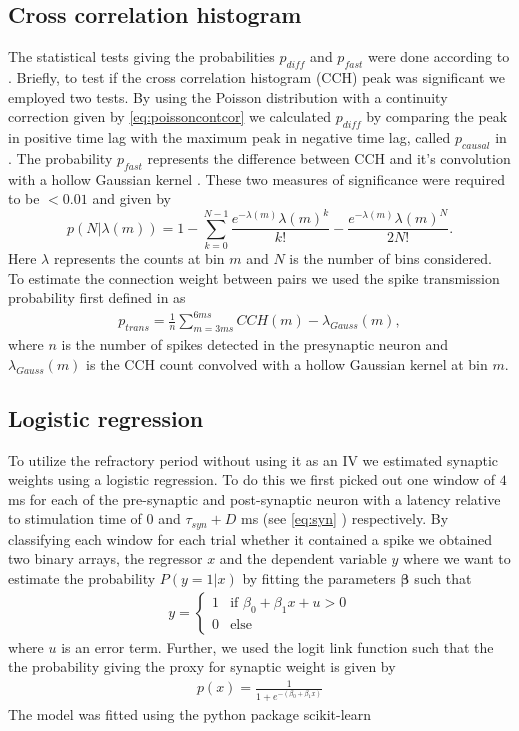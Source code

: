 \documentclass[11pt]{article}
\renewcommand{\vec}[1]{\boldsymbol{#1}}
\begin{document}
\subsection{Cross correlation histogram}\label{sec:method:cch}
The statistical tests giving the probabilities $ p_{diff} $ and $ p_{fast} $ were done according to \cite{Stark2009, English2017}. 
Briefly, to test if the cross correlation histogram (CCH) peak was significant we employed two tests. 
By using the Poisson distribution with a continuity correction \citep{Stark2009} given by \cref{eq:poissoncontcor} we calculated $ p_{diff} $ by comparing the peak in positive time lag with the maximum peak in negative time lag, called $p_{causal}$ in \citet{English2017}. 
The probability $ p_{fast} $ represents the difference between CCH and it's convolution with a hollow Gaussian kernel \citep{Stark2009}. 
These two measures of significance were required to be $<0.01$ and given by
\begin{equation}
p(N|\lambda(m)) = 1 - \sum_{k=0}^{N-1}\frac{e^{-\lambda(m)}\lambda(m)^k}{k!} - \frac{e^{-\lambda(m)}\lambda(m)^N}{2N!}.
\label{eq:poissoncontcor}
\end{equation}
Here $ \lambda $ represents the counts at bin $ m $ and $ N $ is the number of bins considered. 
To estimate the connection weight between pairs we used the spike transmission probability first defined in \citet{English2017} as 
\begin{align}
\label{eq:ptrans}
p_{trans} = \frac{1}{n}\sum_{m=3ms}^{6ms} CCH(m) - \lambda_{Gauss}(m),
\end{align}
where $ n $ is the number of spikes detected in the presynaptic neuron and $\lambda_{Gauss}(m)$ is the CCH count convolved with a hollow Gaussian kernel at bin $m$.

\subsection{Logistic regression}
To utilize the refractory period without using it as an IV we estimated synaptic weights using a logistic regression. 
To do this we first picked out one window of $ 4 $ ms for each of the pre-synaptic and post-synaptic neuron with a latency relative to stimulation time of $ 0 $ and $ \tau_{syn} + D $ ms (see \cref{eq:syn} ) respectively. 
By classifying each window for each trial whether it contained a spike we obtained two binary arrays, the regressor $ x $ and the dependent variable $ y $ where we want to estimate the probability $ P(y = 1|x) $ by fitting the parameters $ \vec{\beta} $ such that
\begin{align}
y = \begin{cases}
	1 & \text{if } \beta_0 + \beta_1x + u > 0\\
    0 & \text{else}
\end{cases}
\end{align}
where $ u $ is an error term. 
Further, we used the logit link function such that the the probability giving the proxy for synaptic weight is given by
\begin{align}
p(x) = \frac{1}{1 + e^{-(\beta_0 + \beta_1x)}}
\end{align}
The model was fitted using the python package scikit-learn \citep{scikit-learn}
\end{document}
